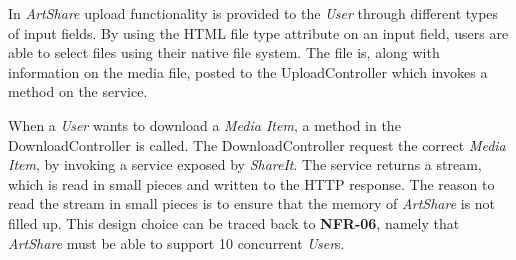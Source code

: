 \documentclass[../report.tex]{subfiles}
\begin{document}
In \textit{ArtShare} upload functionality is provided to the \textit{User} through different types of input fields. By using the HTML file type attribute\cite{w3schools2014} on an input field, users are able to select files using their native file system. The file is, along with information on the media file, posted to the UploadController which invokes a method on the service.

When a \textit{User} wants to download a \textit{Media Item}, a method in the DownloadController is called. The DownloadController request the correct \textit{Media Item}, by invoking a service exposed by \textit{ShareIt}. The service returns a stream, which is read in small pieces and written to the HTTP response. The reason to read the stream in small pieces is to ensure that the memory of \textit{ArtShare} is not filled up. This design choice can be traced back to \textbf{NFR-06}, namely that \textit{ArtShare} must be able to support 10 concurrent \textit{User}s. 
\end{document}
